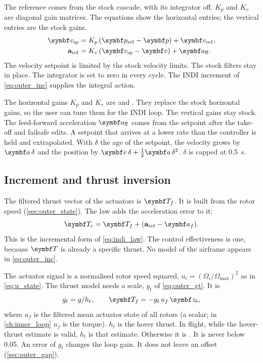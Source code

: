 The reference comes from the stock cascade, with its integrator off.
$K_p$ and $K_v$ are diagonal gain matrices.
The equations show the horizontal entries; the vertical entries are the stock gains.
\begin{align}
  \vect v_{\mathrm{sp}} &= K_p\,(\vect p_{\mathrm{ref}} - \vect p) + \vect v_{\mathrm{ref}} , \label{eq:outer_vsp}\\
  \aref &= K_v\,(\vect v_{\mathrm{sp}} - \vect v) + \vect a_{\mathrm{ff}} . \label{eq:outer_aref}
\end{align}
The velocity setpoint is limited by the stock velocity limits.
The stock filters stay in place.
The integrator is set to zero in every cycle.
The INDI increment of \cref{eq:outer_inc} supplies the integral action.

The horizontal gains $K_p$ and $K_v$ are  and .
They replace the stock horizontal gains, so the user can tune them for the INDI loop.
The vertical gains stay stock.
The feed-forward acceleration $\vect a_{\mathrm{ff}}$ comes from the setpoint after the take-off and failsafe edits.
A setpoint that arrives at a lower rate than the controller is held and extrapolated.
With $\delta$ the age of the setpoint, the velocity grows by $\vect a\,\delta$ and the position by $\vect v\,\delta + \tfrac12 \vect a\,\delta^2$.
$\delta$ is capped at 0.5~s.

\subsection{Increment and thrust inversion}\label{sec:outer_inc}

The filtered thrust vector of the actuators is $\vect T_f$.
It is built from the rotor speed (\cref{sec:outer_state}).
The law adds the acceleration error to it:
\begin{equation}\label{eq:outer_inc}
  \vect T_c = \vect T_f + (\aref - \vect a_f) .
\end{equation}
This is the incremental form of \cref{eq:indi_law}.
The control effectiveness is one, because $\vect T$ is already a specific thrust.
No model of the airframe appears in \cref{eq:outer_inc}.

The actuator signal is a normalised rotor speed squared, $u_i = (\Omega_i/\Omega_{\max})^2$ as in \cref{eq:u_state}.
The thrust model needs a scale, $g_t$ of \cref{eq:outer_gt}.
It is
\begin{equation}\label{eq:outer_gt}
  g_t = g / h_t , \qquad \vect T_f = -g_t\,u_f\,\vect z_b ,
\end{equation}
where $u_f$ is the filtered mean actuator state of all rotors (a scalar; in \cref{ch:inner_loop} $u_f$ is the torque).
$h_t$ is the hover thrust.
In flight, while the hover-thrust estimate is valid, $h_t$ is that estimate.
Otherwise it is .
It is never below 0.05.
An error of $g_t$ changes the loop gain.
It does not leave an offset (\cref{sec:outer_gap}).

